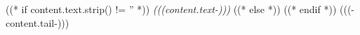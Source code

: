 ((* if content.text.strip() != '' *))
\emph{(((content.text-)))} 
((* else *))
((* endif *))
 (((-content.tail-))) 
